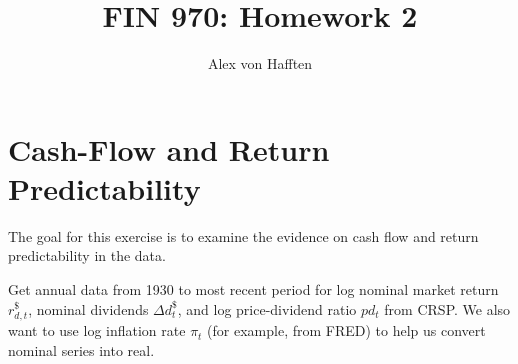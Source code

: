 \documentclass{article}
\title{FIN 970: Homework 2}
\author{Alex von Hafften }
\begin{document}
\maketitle

\section{Cash-Flow and Return Predictability}

The goal for this exercise is to examine the evidence on cash flow and return predictability in the data.

\bigskip

Get annual data from 1930 to most recent period for log nominal market return $r_{d,t}^{\$}$, nominal dividends $\Delta d_{t}^{\$}$, and log price-dividend ratio $pd_t$ from CRSP. We also want to use log inflation rate $\pi_t$ (for example, from FRED) to help us convert nominal series into real.
\end{document}
